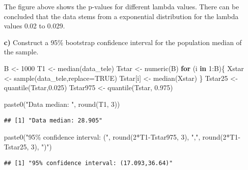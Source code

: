\documentclass[
]{article}
\newenvironment{Shaded}{\begin{snugshade}}{\end{snugshade}}
\newcommand{\AttributeTok}[1]{\textcolor[rgb]{0.77,0.63,0.00}{#1}}
\newcommand{\ConstantTok}[1]{\textcolor[rgb]{0.00,0.00,0.00}{#1}}
\newcommand{\ControlFlowTok}[1]{\textcolor[rgb]{0.13,0.29,0.53}{\textbf{#1}}}
\newcommand{\DecValTok}[1]{\textcolor[rgb]{0.00,0.00,0.81}{#1}}
\newcommand{\FloatTok}[1]{\textcolor[rgb]{0.00,0.00,0.81}{#1}}
\newcommand{\FunctionTok}[1]{\textcolor[rgb]{0.00,0.00,0.00}{#1}}
\newcommand{\NormalTok}[1]{#1}
\newcommand{\OtherTok}[1]{\textcolor[rgb]{0.56,0.35,0.01}{#1}}
\newcommand{\SpecialCharTok}[1]{\textcolor[rgb]{0.00,0.00,0.00}{#1}}
\newcommand{\StringTok}[1]{\textcolor[rgb]{0.31,0.60,0.02}{#1}}
\begin{document}
The figure above shows the p-values for different lambda values. There
can be concluded that the data stems from a exponential distribution for
the lambda values 0.02 to 0.029.

\textbf{c)} Construct a 95\% bootstrap confidence interval for the
population median of the sample.

\begin{Shaded}
\begin{Highlighting}[]
\NormalTok{B }\OtherTok{\textless{}{-}} \DecValTok{1000}
\NormalTok{T1 }\OtherTok{\textless{}{-}} \FunctionTok{median}\NormalTok{(data\_tele)}
\NormalTok{Tstar }\OtherTok{\textless{}{-}} \FunctionTok{numeric}\NormalTok{(B)}
\ControlFlowTok{for}\NormalTok{ (i }\ControlFlowTok{in} \DecValTok{1}\SpecialCharTok{:}\NormalTok{B)\{}
\NormalTok{  Xstar }\OtherTok{\textless{}{-}} \FunctionTok{sample}\NormalTok{(data\_tele,}\AttributeTok{replace=}\ConstantTok{TRUE}\NormalTok{)}
\NormalTok{  Tstar[i] }\OtherTok{\textless{}{-}} \FunctionTok{median}\NormalTok{(Xstar)}
\NormalTok{\}}
\NormalTok{Tstar25 }\OtherTok{\textless{}{-}} \FunctionTok{quantile}\NormalTok{(Tstar,}\FloatTok{0.025}\NormalTok{)}
\NormalTok{Tstar975 }\OtherTok{\textless{}{-}} \FunctionTok{quantile}\NormalTok{(Tstar, }\FloatTok{0.975}\NormalTok{)}

\FunctionTok{paste0}\NormalTok{(}\StringTok{"Data median: "}\NormalTok{, }\FunctionTok{round}\NormalTok{(T1, }\DecValTok{3}\NormalTok{))}
\end{Highlighting}
\end{Shaded}

\begin{verbatim}
## [1] "Data median: 28.905"
\end{verbatim}

\begin{Shaded}
\begin{Highlighting}[]
\FunctionTok{paste0}\NormalTok{(}\StringTok{"95\% confidence interval: ("}\NormalTok{, }\FunctionTok{round}\NormalTok{(}\DecValTok{2}\SpecialCharTok{*}\NormalTok{T1}\SpecialCharTok{{-}}\NormalTok{Tstar975, }\DecValTok{3}\NormalTok{), }
       \StringTok{","}\NormalTok{, }\FunctionTok{round}\NormalTok{(}\DecValTok{2}\SpecialCharTok{*}\NormalTok{T1}\SpecialCharTok{{-}}\NormalTok{Tstar25, }\DecValTok{3}\NormalTok{), }\StringTok{")"}\NormalTok{)}
\end{Highlighting}
\end{Shaded}

\begin{verbatim}
## [1] "95% confidence interval: (17.093,36.64)"
\end{verbatim}
\end{document}
